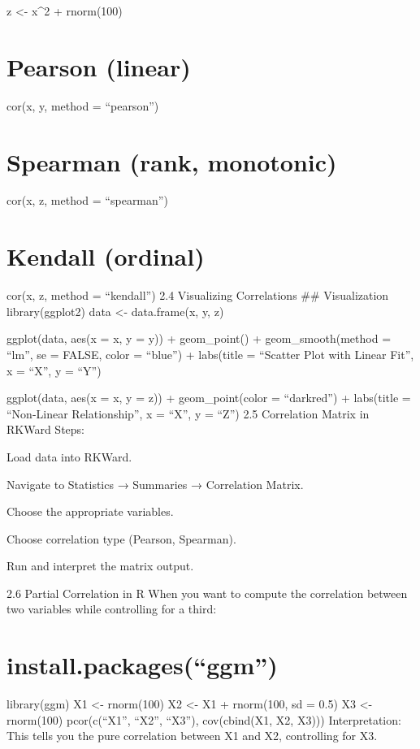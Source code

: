 \documentclass[
  letterpaper,
  DIV=11,
  numbers=noendperiod]{scrreprt}
\begin{document}
z \textless- x\^{}2 + rnorm(100)

\section{Pearson (linear)}\label{pearson-linear}

cor(x, y, method = ``pearson'')

\section{Spearman (rank, monotonic)}\label{spearman-rank-monotonic}

cor(x, z, method = ``spearman'')

\section{Kendall (ordinal)}\label{kendall-ordinal}

cor(x, z, method = ``kendall'') 2.4 Visualizing Correlations \#\#
Visualization library(ggplot2) data \textless- data.frame(x, y, z)

ggplot(data, aes(x = x, y = y)) + geom\_point() + geom\_smooth(method =
``lm'', se = FALSE, color = ``blue'') + labs(title = ``Scatter Plot with
Linear Fit'', x = ``X'', y = ``Y'')

ggplot(data, aes(x = x, y = z)) + geom\_point(color = ``darkred'') +
labs(title = ``Non-Linear Relationship'', x = ``X'', y = ``Z'') 2.5
Correlation Matrix in RKWard Steps:

Load data into RKWard.

Navigate to Statistics → Summaries → Correlation Matrix.

Choose the appropriate variables.

Choose correlation type (Pearson, Spearman).

Run and interpret the matrix output.

2.6 Partial Correlation in R When you want to compute the correlation
between two variables while controlling for a third:

\section{install.packages(``ggm'')}\label{install.packagesggm}

library(ggm) X1 \textless- rnorm(100) X2 \textless- X1 + rnorm(100, sd =
0.5) X3 \textless- rnorm(100) pcor(c(``X1'', ``X2'', ``X3''),
cov(cbind(X1, X2, X3))) Interpretation: This tells you the pure
correlation between X1 and X2, controlling for X3.
\end{document}
